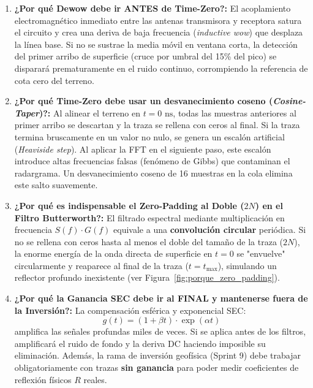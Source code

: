 \documentclass[11pt,a4paper]{article}
\begin{document}
\begin{enumerate}
    \item \textbf{¿Por qué Dewow debe ir ANTES de Time-Zero?:}
    El acoplamiento electromagnético inmediato entre las antenas transmisora y receptora satura el circuito y crea una deriva de baja frecuencia (\textit{inductive wow}) que desplaza la línea base. Si no se sustrae la media móvil en ventana corta, la detección del primer arribo de superficie (cruce por umbral del 15\% del pico) se disparará prematuramente en el ruido continuo, corrompiendo la referencia de cota cero del terreno.
    \item \textbf{¿Por qué Time-Zero debe usar un desvanecimiento coseno (\textit{Cosine-Taper})?:}
    Al alinear el terreno en $t=0\text{ ns}$, todas las muestras anteriores al primer arribo se descartan y la traza se rellena con ceros al final. Si la traza termina bruscamente en un valor no nulo, se genera un escalón artificial (\textit{Heaviside step}). Al aplicar la FFT en el siguiente paso, este escalón introduce altas frecuencias falsas (fenómeno de Gibbs) que contaminan el radargrama. Un desvanecimiento coseno de 16 muestras en la cola elimina este salto suavemente.
    \item \textbf{¿Por qué es indispensable el Zero-Padding al Doble ($2N$) en el Filtro Butterworth?:}
    El filtrado espectral mediante multiplicación en frecuencia $S(f) \cdot G(f)$ equivale a una \textbf{convolución circular} periódica. Si no se rellena con ceros hasta al menos el doble del tamaño de la traza ($2N$), la enorme energía de la onda directa de superficie en $t=0$ se "envuelve" circularmente y reaparece al final de la traza ($t = t_{\text{max}}$), simulando un reflector profundo inexistente (ver Figura~\ref{fig:porque_zero_padding}).
    \item \textbf{¿Por qué la Ganancia SEC debe ir al FINAL y mantenerse fuera de la Inversión?:}
    La compensación esférica y exponencial SEC:
    \begin{equation}
        g(t) = (1 + \beta t) \cdot \exp(\alpha t)
    \end{equation}
    amplifica las señales profundas miles de veces. Si se aplica antes de los filtros, amplificará el ruido de fondo y la deriva DC haciendo imposible su eliminación. Además, la rama de inversión geofísica (Sprint 9) debe trabajar obligatoriamente con trazas \textbf{sin ganancia} para poder medir coeficientes de reflexión físicos $R$ reales.
\end{enumerate}
\end{document}
